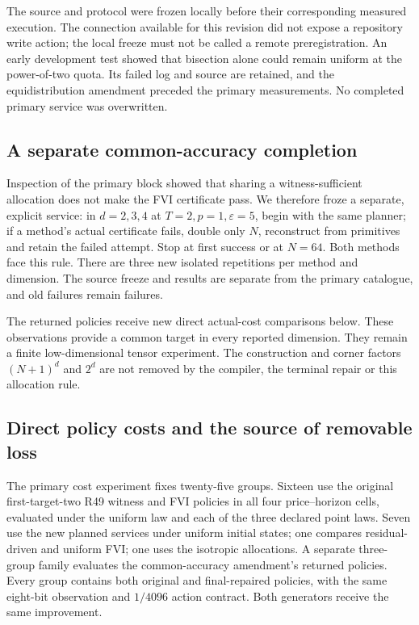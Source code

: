 The source and protocol were frozen locally before their corresponding measured execution. The connection available for this revision did not expose a repository write action; the local freeze must not be called a remote preregistration. An early development test showed that bisection alone could remain uniform at the power-of-two quota. Its failed log and source are retained, and the equidistribution amendment preceded the primary measurements. No completed primary service was overwritten.




\subsection{A separate common-accuracy completion}
Inspection of the primary block showed that sharing a witness-sufficient allocation does not make the FVI certificate pass. We therefore froze a separate, explicit service: in $d=2,3,4$ at $T=2,p=1,\varepsilon=5$, begin with the same planner; if a method's actual certificate fails, double only $N$, reconstruct from primitives and retain the failed attempt. Stop at first success or at $N=64$. Both methods face this rule. There are three new isolated repetitions per method and dimension. The source freeze and results are separate from the primary catalogue, and old failures remain failures.


The returned policies receive new direct actual-cost comparisons below. These observations provide a common target in every reported dimension. They remain a finite low-dimensional tensor experiment. The construction and corner factors $(N+1)^d$ and $2^d$ are not removed by the compiler, the terminal repair or this allocation rule.

\subsection{Direct policy costs and the source of removable loss}
The primary cost experiment fixes twenty-five groups. Sixteen use the original first-target-two R49 witness and FVI policies in all four price--horizon cells, evaluated under the uniform law and each of the three declared point laws. Seven use the new planned services under uniform initial states; one compares residual-driven and uniform FVI; one uses the isotropic allocations. A separate three-group family evaluates the common-accuracy amendment's returned policies. Every group contains both original and final-repaired policies, with the same eight-bit observation and $1/4096$ action contract. Both generators receive the same improvement.

